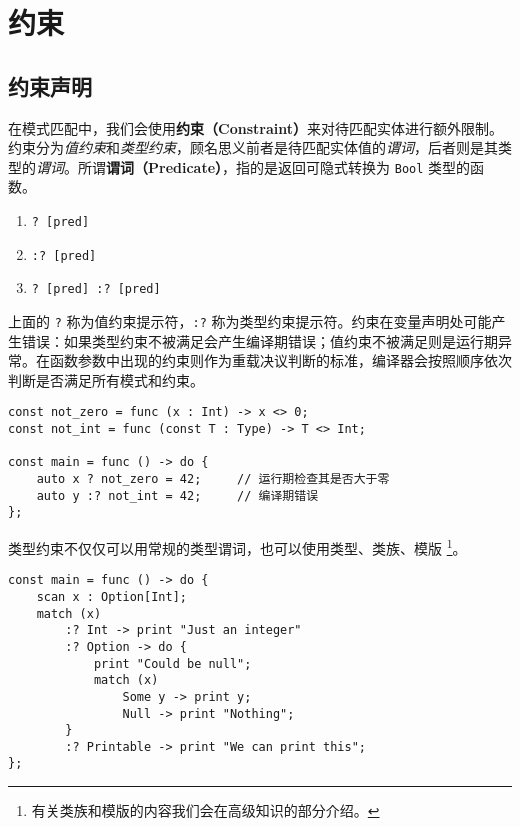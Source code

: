\section{约束}

\subsection{约束声明}

在模式匹配中，我们会使用\textbf{约束（Constraint）}来对待匹配实体进行额外限制。约束分为\emph{值约束}和\emph{类型约束}，顾名思义前者是待匹配实体值的\emph{谓词}，后者则是其类型的\emph{谓词}。所谓\textbf{谓词（Predicate）}，指的是返回可隐式转换为 \lstinline!Bool! 类型的函数。

\begin{grammar}[约束 \texttt{[constr]}] \label{grm:constr}
\begin{enumerate}
    \item \lstinline!? [pred]!
    \item \lstinline!:? [pred]!
    \item \lstinline!? [pred] :? [pred]!
\end{enumerate}
\end{grammar}

上面的 \lstinline!?! 称为值约束提示符，\lstinline!:?! 称为类型约束提示符。约束在变量声明处可能产生错误：如果类型约束不被满足会产生编译期错误；值约束不被满足则是运行期异常。在函数参数中出现的约束则作为重载决议判断的标准，编译器会按照顺序依次判断是否满足所有模式和约束。

\begin{lstlisting}
const not_zero = func (x : Int) -> x <> 0;
const not_int = func (const T : Type) -> T <> Int;

const main = func () -> do {
    auto x ? not_zero = 42;     // 运行期检查其是否大于零
    auto y :? not_int = 42;     // 编译期错误
};
\end{lstlisting}

类型约束不仅仅可以用常规的类型谓词，也可以使用类型、类族、模版 \footnote{有关类族和模版的内容我们会在高级知识的部分介绍。}。

\begin{lstlisting}
const main = func () -> do {
    scan x : Option[Int];
    match (x)
        :? Int -> print "Just an integer"
        :? Option -> do {
            print "Could be null";
            match (x)
                Some y -> print y;
                Null -> print "Nothing";
        }
        :? Printable -> print "We can print this";
};
\end{lstlisting}

